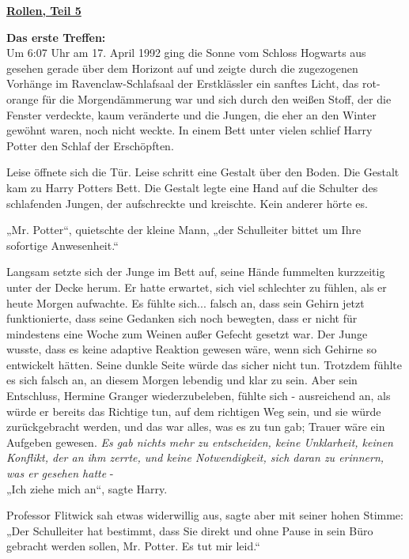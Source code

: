 

\hypertarget{rollen-teil-5}{%

\textbf{\uline{Rollen, Teil 5}}

\hfill\break \textbf{Das erste Treffen:}\\ Um 6:07 Uhr am 17. April 1992 ging die Sonne vom Schloss Hogwarts aus gesehen gerade über dem Horizont auf und zeigte durch die zugezogenen Vorhänge im Ravenclaw-Schlafsaal der Erstklässler ein sanftes Licht, das rot-orange für die Morgendämmerung war und sich durch den weißen Stoff, der die Fenster verdeckte, kaum veränderte und die Jungen, die eher an den Winter gewöhnt waren, noch nicht weckte. In einem Bett unter vielen schlief Harry Potter den Schlaf der Erschöpften.

Leise öffnete sich die Tür. Leise schritt eine Gestalt über den Boden. Die Gestalt kam zu Harry Potters Bett. Die Gestalt legte eine Hand auf die Schulter des schlafenden Jungen, der aufschreckte und kreischte. Kein anderer hörte es.

„Mr. Potter“, quietschte der kleine Mann, „der Schulleiter bittet um Ihre sofortige Anwesenheit.“

Langsam setzte sich der Junge im Bett auf, seine Hände fummelten kurzzeitig unter der Decke herum. Er hatte erwartet, sich viel schlechter zu fühlen, als er heute Morgen aufwachte. Es fühlte sich... falsch an, dass sein Gehirn jetzt funktionierte, dass seine Gedanken sich noch bewegten, dass er nicht für mindestens eine Woche zum Weinen außer Gefecht gesetzt war. Der Junge wusste, dass es keine adaptive Reaktion gewesen wäre, wenn sich Gehirne so entwickelt hätten. Seine dunkle Seite würde das sicher nicht tun. Trotzdem fühlte es sich falsch an, an diesem Morgen lebendig und klar zu sein. Aber sein Entschluss, Hermine Granger wiederzubeleben, fühlte sich - ausreichend an, als würde er bereits das Richtige tun, auf dem richtigen Weg sein, und sie würde zurückgebracht werden, und das war alles, was es zu tun gab; Trauer wäre ein Aufgeben gewesen. \emph{Es gab nichts mehr zu entscheiden, keine Unklarheit, keinen Konflikt, der an ihm zerrte, und keine Notwendigkeit, sich daran zu erinnern, was er gesehen hatte} -\\ „Ich ziehe mich an“, sagte Harry.

Professor Flitwick sah etwas widerwillig aus, sagte aber mit seiner hohen Stimme: „Der Schulleiter hat bestimmt, dass Sie direkt und ohne Pause in sein Büro gebracht werden sollen, Mr. Potter. Es tut mir leid.“

}

